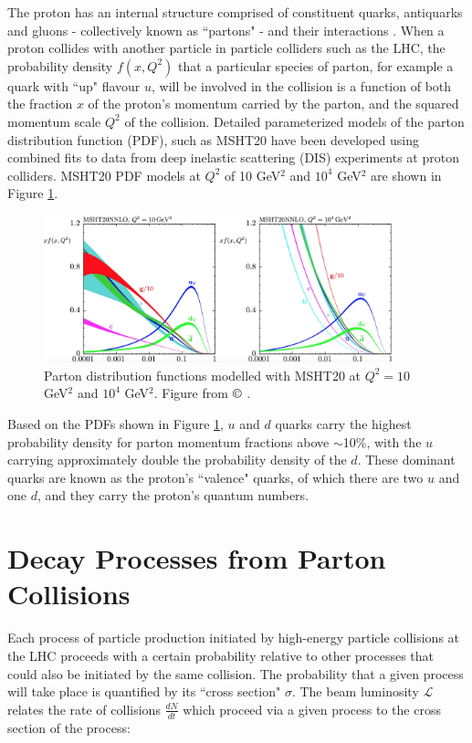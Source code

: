 The proton has an internal structure comprised of constituent quarks, antiquarks and gluons - collectively known as ``partons" - and their interactions \cite{parton_model}. When a proton collides with another particle in particle colliders such as the LHC, the probability density $f(x, Q^2)$ that a particular species of parton, for example a quark with ``up" flavour $u$, will be involved in the collision is a function of both the fraction $x$ of the proton's momentum carried by the parton, and the squared momentum scale $Q^2$ of the collision. Detailed parameterized models of the parton distribution function (PDF), such as MSHT20 \cite{MSHT20} have been developed using combined fits to data from deep inelastic scattering (DIS) experiments at proton colliders. MSHT20 PDF models at $Q^2$ of 10 GeV$^2$ and $10^4$ GeV$^2$ are shown in Figure \ref{fig:msht20_pdfs}.

\begin{figure}[H]
	\centering
	\includegraphics[width=0.9\textwidth]{Figures/3/MSHT20_PDFs.png}
	\caption[]{Parton distribution functions modelled with MSHT20 at $Q^2=10$ GeV$^2$ and $10^4$ GeV$^2$. Figure from $\copyright$ \cite{MSHT20}.}
	\label{fig:msht20_pdfs}
\end{figure}

Based on the PDFs shown in Figure \ref{fig:msht20_pdfs}, $u$ and $d$ quarks carry the highest probability density for parton momentum fractions above $\sim$10\%, with the $u$ carrying approximately double the probability density of the $d$. These dominant quarks are known as the proton's ``valence" quarks, of which there are two $u$ and one $d$, and they carry the proton's quantum numbers.

\section{Decay Processes from Parton Collisions}
\label{sec:decay_processes}

Each process of particle production initiated by high-energy particle collisions at the LHC proceeds with a certain probability relative to other processes that could also be initiated by the same collision. The probability that a given process will take place is quantified by its ``cross section" $\sigma$. The beam luminosity $\mathcal{L}$ relates the rate of collisions $\frac{dN}{dt}$ which proceed via a given process to the cross section of the process:

